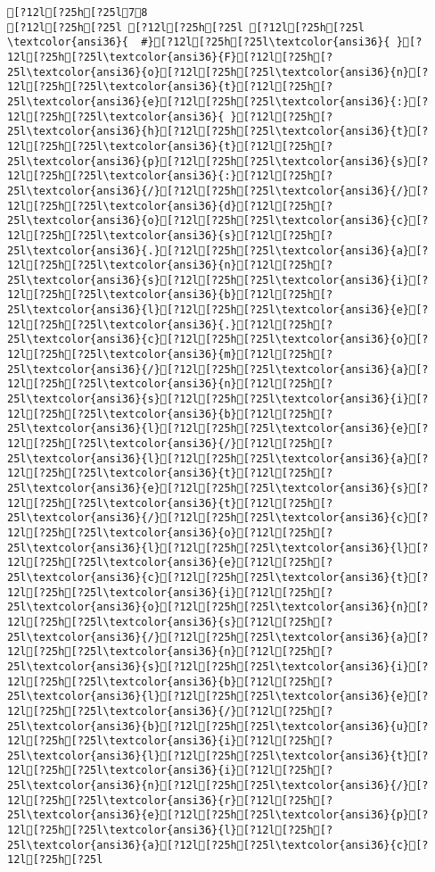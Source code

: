 \documentclass{scrartcl}
\begin{document}
\begin{Verbatim}
[?12l[?25h[?25l78
[?12l[?25h[?25l [?12l[?25h[?25l [?12l[?25h[?25l
\textcolor{ansi36}{  #}[?12l[?25h[?25l\textcolor{ansi36}{ }[?12l[?25h[?25l\textcolor{ansi36}{F}[?12l[?25h[?25l\textcolor{ansi36}{o}[?12l[?25h[?25l\textcolor{ansi36}{n}[?12l[?25h[?25l\textcolor{ansi36}{t}[?12l[?25h[?25l\textcolor{ansi36}{e}[?12l[?25h[?25l\textcolor{ansi36}{:}[?12l[?25h[?25l\textcolor{ansi36}{ }[?12l[?25h[?25l\textcolor{ansi36}{h}[?12l[?25h[?25l\textcolor{ansi36}{t}[?12l[?25h[?25l\textcolor{ansi36}{t}[?12l[?25h[?25l\textcolor{ansi36}{p}[?12l[?25h[?25l\textcolor{ansi36}{s}[?12l[?25h[?25l\textcolor{ansi36}{:}[?12l[?25h[?25l\textcolor{ansi36}{/}[?12l[?25h[?25l\textcolor{ansi36}{/}[?12l[?25h[?25l\textcolor{ansi36}{d}[?12l[?25h[?25l\textcolor{ansi36}{o}[?12l[?25h[?25l\textcolor{ansi36}{c}[?12l[?25h[?25l\textcolor{ansi36}{s}[?12l[?25h[?25l\textcolor{ansi36}{.}[?12l[?25h[?25l\textcolor{ansi36}{a}[?12l[?25h[?25l\textcolor{ansi36}{n}[?12l[?25h[?25l\textcolor{ansi36}{s}[?12l[?25h[?25l\textcolor{ansi36}{i}[?12l[?25h[?25l\textcolor{ansi36}{b}[?12l[?25h[?25l\textcolor{ansi36}{l}[?12l[?25h[?25l\textcolor{ansi36}{e}[?12l[?25h[?25l\textcolor{ansi36}{.}[?12l[?25h[?25l\textcolor{ansi36}{c}[?12l[?25h[?25l\textcolor{ansi36}{o}[?12l[?25h[?25l\textcolor{ansi36}{m}[?12l[?25h[?25l\textcolor{ansi36}{/}[?12l[?25h[?25l\textcolor{ansi36}{a}[?12l[?25h[?25l\textcolor{ansi36}{n}[?12l[?25h[?25l\textcolor{ansi36}{s}[?12l[?25h[?25l\textcolor{ansi36}{i}[?12l[?25h[?25l\textcolor{ansi36}{b}[?12l[?25h[?25l\textcolor{ansi36}{l}[?12l[?25h[?25l\textcolor{ansi36}{e}[?12l[?25h[?25l\textcolor{ansi36}{/}[?12l[?25h[?25l\textcolor{ansi36}{l}[?12l[?25h[?25l\textcolor{ansi36}{a}[?12l[?25h[?25l\textcolor{ansi36}{t}[?12l[?25h[?25l\textcolor{ansi36}{e}[?12l[?25h[?25l\textcolor{ansi36}{s}[?12l[?25h[?25l\textcolor{ansi36}{t}[?12l[?25h[?25l\textcolor{ansi36}{/}[?12l[?25h[?25l\textcolor{ansi36}{c}[?12l[?25h[?25l\textcolor{ansi36}{o}[?12l[?25h[?25l\textcolor{ansi36}{l}[?12l[?25h[?25l\textcolor{ansi36}{l}[?12l[?25h[?25l\textcolor{ansi36}{e}[?12l[?25h[?25l\textcolor{ansi36}{c}[?12l[?25h[?25l\textcolor{ansi36}{t}[?12l[?25h[?25l\textcolor{ansi36}{i}[?12l[?25h[?25l\textcolor{ansi36}{o}[?12l[?25h[?25l\textcolor{ansi36}{n}[?12l[?25h[?25l\textcolor{ansi36}{s}[?12l[?25h[?25l\textcolor{ansi36}{/}[?12l[?25h[?25l\textcolor{ansi36}{a}[?12l[?25h[?25l\textcolor{ansi36}{n}[?12l[?25h[?25l\textcolor{ansi36}{s}[?12l[?25h[?25l\textcolor{ansi36}{i}[?12l[?25h[?25l\textcolor{ansi36}{b}[?12l[?25h[?25l\textcolor{ansi36}{l}[?12l[?25h[?25l\textcolor{ansi36}{e}[?12l[?25h[?25l\textcolor{ansi36}{/}[?12l[?25h[?25l\textcolor{ansi36}{b}[?12l[?25h[?25l\textcolor{ansi36}{u}[?12l[?25h[?25l\textcolor{ansi36}{i}[?12l[?25h[?25l\textcolor{ansi36}{l}[?12l[?25h[?25l\textcolor{ansi36}{t}[?12l[?25h[?25l\textcolor{ansi36}{i}[?12l[?25h[?25l\textcolor{ansi36}{n}[?12l[?25h[?25l\textcolor{ansi36}{/}[?12l[?25h[?25l\textcolor{ansi36}{r}[?12l[?25h[?25l\textcolor{ansi36}{e}[?12l[?25h[?25l\textcolor{ansi36}{p}[?12l[?25h[?25l\textcolor{ansi36}{l}[?12l[?25h[?25l\textcolor{ansi36}{a}[?12l[?25h[?25l\textcolor{ansi36}{c}[?12l[?25h[?25l
\end{Verbatim}
\end{document}
